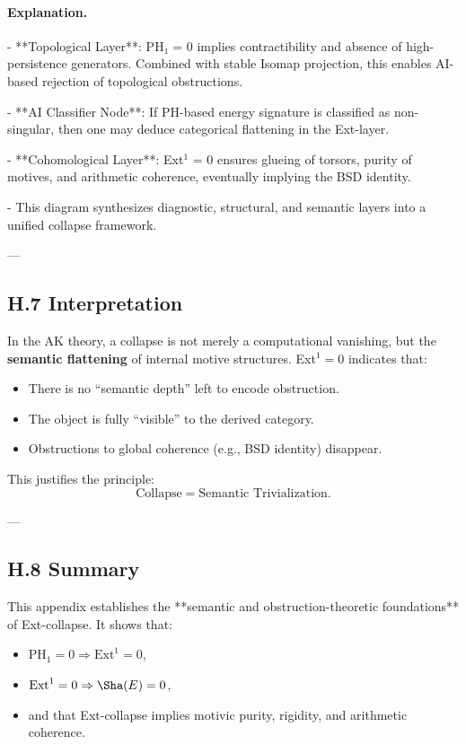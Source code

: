 \documentclass[11pt]{article}
\theoremstyle{definition}
\begin{document}
\paragraph{Explanation.}

- **Topological Layer**: PH₁ = 0 implies contractibility and absence of high-persistence generators.  
  Combined with stable Isomap projection, this enables AI-based rejection of topological obstructions.

- **AI Classifier Node**: If PH-based energy signature is classified as non-singular, then one may deduce categorical flattening in the Ext-layer.

- **Cohomological Layer**: Ext$^1$ = 0 ensures glueing of torsors, purity of motives, and arithmetic coherence, eventually implying the BSD identity.

- This diagram synthesizes diagnostic, structural, and semantic layers into a unified collapse framework.

---

\subsection*{H.7 Interpretation}

In the AK theory, a collapse is not merely a computational vanishing,  
but the \textbf{semantic flattening} of internal motive structures.  
Ext$^1 = 0$ indicates that:

\begin{itemize}
  \item There is no “semantic depth” left to encode obstruction.
  \item The object is fully “visible” to the derived category.
  \item Obstructions to global coherence (e.g., BSD identity) disappear.
\end{itemize}

This justifies the principle:
\[
\text{Collapse} = \text{Semantic Trivialization}.
\]

---

\subsection*{H.8 Summary}

This appendix establishes the **semantic and obstruction-theoretic foundations** of Ext-collapse.  
It shows that:
\begin{itemize}
  \item \( \mathrm{PH}_1 = 0 \Rightarrow \mathrm{Ext}^1 = 0 \),
  \item \( \mathrm{Ext}^1 = 0 \Rightarrow \Sha(E) = 0 \),
  \item and that Ext-collapse implies motivic purity, rigidity, and arithmetic coherence.
\end{itemize}
\end{document}
